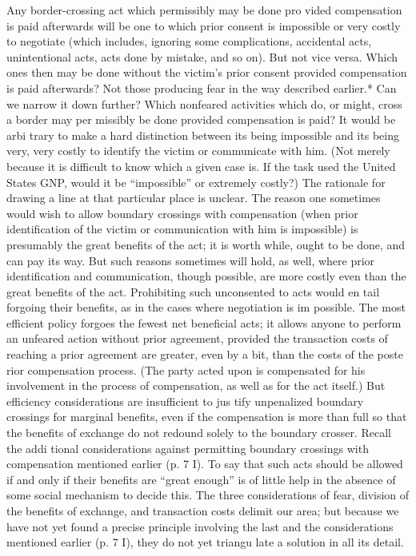 \documentclass[11pt,openany]{book}
\begin{document}
Any border-crossing act which permissibly may be done pro vided compensation is paid afterwards will be one to which prior consent is impossible or very costly to negotiate (which includes, ignoring some complications, accidental acts, unintentional acts, acts done by mistake, and so on). But not vice versa. Which ones then may be done without the victim's prior consent provided compensation is paid afterwards? Not those producing fear in the way described earlier.* Can we narrow it down further? Which nonfeared activities which do, or might, cross a border may per missibly be done provided compensation is paid? It would be arbi trary to make a hard distinction between its being impossible and its being very, very costly to identify the victim or communicate with him. (Not merely because it is difficult to know which a given case is. If the task used the United States GNP, would it be ``impossible'' or extremely costly?) The rationale for drawing a line at that particular place is unclear. The reason one sometimes would wish to allow boundary crossings with compensation (when prior identification of the victim or communication with him is impossible) is presumably the great benefits of the act; it is worth while, ought to be done, and can pay its way. But such reasons sometimes will hold, as well, where prior identification and communication, though possible, are more costly even than the great benefits of the act. Prohibiting such unconsented to acts would en tail forgoing their benefits, as in the cases where negotiation is im possible. The most efficient policy forgoes the fewest net beneficial acts; it allows anyone to perform an unfeared action without prior agreement, provided the transaction costs of reaching a prior agreement are greater, even by a bit, than the costs of the poste rior compensation process. (The party acted upon is compensated for his involvement in the process of compensation, as well as for the act itself.) But efficiency considerations are insufficient to jus tify unpenalized boundary crossings for marginal benefits, even if the compensation is more than full so that the benefits of exchange do not redound solely to the boundary crosser. Recall the addi tional considerations against permitting boundary crossings with compensation mentioned earlier (p. 7 I). To say that such acts should be allowed if and only if their benefits are ``great enough'' is of little help in the absence of some social mechanism to decide this. The three considerations of fear, division of the benefits of exchange, and transaction costs delimit our area; but because we have not yet found a precise principle involving the last and the considerations mentioned earlier (p. 7 I), they do not yet triangu late a solution in all its detail. 
\end{document}
